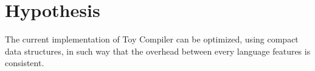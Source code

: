 \documentclass[submission]{eptcs}
\begin{document}
\section{Hypothesis}

The current implementation of Toy Compiler can be optimized, using compact data structures, in such way that the overhead between every language features is consistent.


%
%
%
%
%
%
%

\nocite{*}


\end{document}
